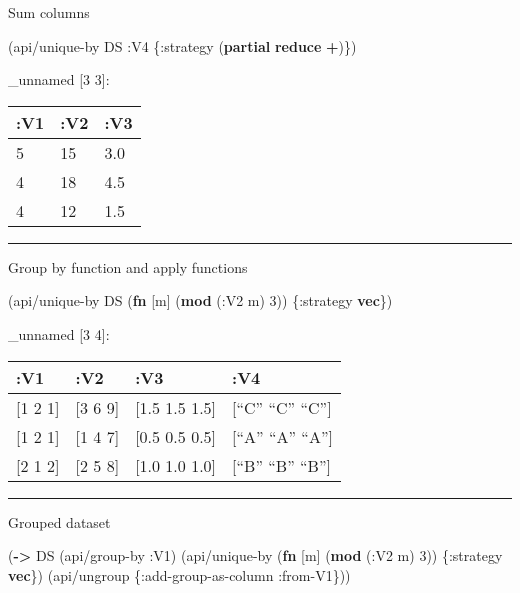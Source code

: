 \documentclass[]{article}
\newenvironment{Shaded}{\begin{snugshade}}{\end{snugshade}}
\newcommand{\AttributeTok}[1]{\textcolor[rgb]{0.77,0.63,0.00}{#1}}
\newcommand{\DecValTok}[1]{\textcolor[rgb]{0.00,0.00,0.81}{#1}}
\newcommand{\KeywordTok}[1]{\textcolor[rgb]{0.13,0.29,0.53}{\textbf{#1}}}
\newcommand{\NormalTok}[1]{#1}
\begin{document}
Sum columns

\begin{Shaded}
\begin{Highlighting}[]
\NormalTok{(api/unique-by DS }\AttributeTok{:V4}\NormalTok{ \{}\AttributeTok{:strategy}\NormalTok{ (}\KeywordTok{partial} \KeywordTok{reduce} \KeywordTok{+}\NormalTok{)\})}
\end{Highlighting}
\end{Shaded}

\_unnamed {[}3 3{]}:

\begin{longtable}[]{@{}lll@{}}
\toprule
:V1 & :V2 & :V3\tabularnewline
\midrule
\endhead
5 & 15 & 3.0\tabularnewline
4 & 18 & 4.5\tabularnewline
4 & 12 & 1.5\tabularnewline
\bottomrule
\end{longtable}

\begin{center}\rule{0.5\linewidth}{0.5pt}\end{center}

Group by function and apply functions

\begin{Shaded}
\begin{Highlighting}[]
\NormalTok{(api/unique-by DS (}\KeywordTok{fn}\NormalTok{ [m] (}\KeywordTok{mod}\NormalTok{ (}\AttributeTok{:V2}\NormalTok{ m) }\DecValTok{3}\NormalTok{)) \{}\AttributeTok{:strategy} \KeywordTok{vec}\NormalTok{\})}
\end{Highlighting}
\end{Shaded}

\_unnamed {[}3 4{]}:

\begin{longtable}[]{@{}llll@{}}
\toprule
:V1 & :V2 & :V3 & :V4\tabularnewline
\midrule
\endhead
{[}1 2 1{]} & {[}3 6 9{]} & {[}1.5 1.5 1.5{]} & {[}``C'' ``C''
``C''{]}\tabularnewline
{[}1 2 1{]} & {[}1 4 7{]} & {[}0.5 0.5 0.5{]} & {[}``A'' ``A''
``A''{]}\tabularnewline
{[}2 1 2{]} & {[}2 5 8{]} & {[}1.0 1.0 1.0{]} & {[}``B'' ``B''
``B''{]}\tabularnewline
\bottomrule
\end{longtable}

\begin{center}\rule{0.5\linewidth}{0.5pt}\end{center}

Grouped dataset

\begin{Shaded}
\begin{Highlighting}[]
\NormalTok{(}\KeywordTok{->}\NormalTok{ DS}
\NormalTok{    (api/group-by }\AttributeTok{:V1}\NormalTok{)}
\NormalTok{    (api/unique-by (}\KeywordTok{fn}\NormalTok{ [m] (}\KeywordTok{mod}\NormalTok{ (}\AttributeTok{:V2}\NormalTok{ m) }\DecValTok{3}\NormalTok{)) \{}\AttributeTok{:strategy} \KeywordTok{vec}\NormalTok{\})}
\NormalTok{    (api/ungroup \{}\AttributeTok{:add-group-as-column} \AttributeTok{:from-V1}\NormalTok{\}))}
\end{Highlighting}
\end{Shaded}
\end{document}
